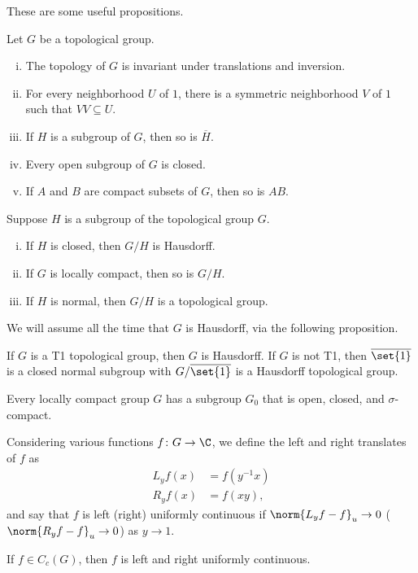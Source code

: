 \documentclass[12pt]{mypackage}
\begin{document}
These are some useful propositions.
\begin{proposition}
  Let $G$ be a topological group.
  \begin{enumerate}[(i)]
    \item The topology of $G$ is invariant under translations and inversion.
    \item For every neighborhood $U$ of $1$, there is a symmetric neighborhood $V$ of $1$ such that $VV\subseteq U$.
    \item If $H$ is a subgroup of $G$, then so is $ \overline{H} $.
    \item Every open subgroup of $G$ is closed.
    \item If $A$ and $B$ are compact subsets of $G$, then so is $AB$.
  \end{enumerate}
\end{proposition}
\begin{proposition}
  Suppose $H$ is a subgroup of the topological group $G$.
  \begin{enumerate}[(i)]
    \item If $H$ is closed, then $G/H$ is Hausdorff.
    \item If $G$ is locally compact, then so is $G/H$.
    \item If $H$ is normal, then $G/H$ is a topological group.
  \end{enumerate}
\end{proposition}
We will assume all the time that $G$ is Hausdorff, via the following proposition.
\begin{corollary}
  If $G$ is a T1 topological group, then $G$ is Hausdorff. If $G$ is not T1, then $ \overline{\set{1}} $ is a closed normal subgroup with $G/ \overline{\set{1}}$ is a Hausdorff topological group.
\end{corollary}
\begin{proposition}
  Every locally compact group $G$ has a subgroup $G_0$ that is open, closed, and $\sigma$-compact.
\end{proposition}
Considering various functions $f\colon G\rightarrow \C$, we define the left and right translates of $f$ as
\begin{align*}
  L_yf(x) &= f\left( y^{-1}x \right)\\
  R_yf(x) &= f\left( xy \right),
\end{align*}
and say that $f$ is left (right) uniformly continuous if $\norm{L_yf-f}_{u}\rightarrow 0$ ($\norm{R_yf-f}_u\rightarrow 0$) as $y\rightarrow 1$.
\begin{proposition}
  If $f\in C_c(G)$, then $f$ is left and right uniformly continuous.
\end{proposition}
\end{document}
